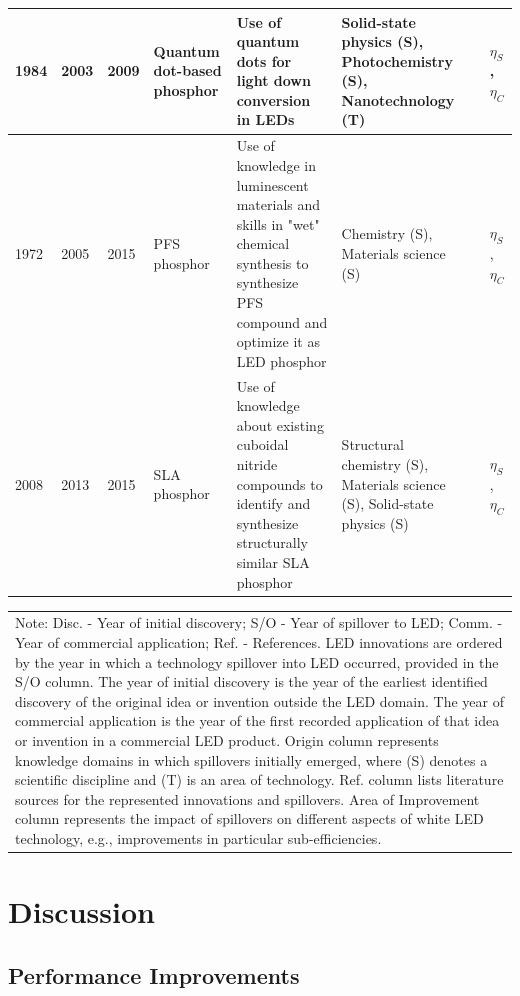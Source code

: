 \documentclass[journal=jacsat,manuscript=article]{achemso}
\begin{document}
\begin{table}[h!]
\begin{tabularx}{\textwidth}{|l|l|l|X|X|X|l|X|}
        1984 & 2003 & 2009 & Quantum dot-based phosphor & Use of quantum dots for light down conversion in LEDs & Solid-state physics (S), Photochemistry (S), Nanotechnology (T) &\cite{fojtik1984photo,simmonsfinal,ledprof_nexxusqd,bourzac2013quantum} & $\eta_S$, $\eta_C$ \\ \hline
        1972 & 2005 & 2015 & PFS phosphor & Use of knowledge in luminescent materials and skills in "wet" chemical synthesis to synthesize PFS compound and optimize it as LED phosphor & Chemistry (S), Materials science (S) &\cite{paulusz1973efficient,radkov2009red,Murphy2015} & $\eta_S$, $\eta_C$ \\ \hline
        2008 & 2013 & 2015 & SLA phosphor & Use of knowledge about existing cuboidal nitride compounds to identify and synthesize structurally similar SLA phosphor & Structural chemistry (S), Materials science (S), Solid-state physics (S) &\cite{Park2008New,schmidt2013new,Pust2014} & $\eta_S$, $\eta_C$ \\ \hline
    \end{tabularx}
    \begin{tabular}{@{}p{\linewidth}@{}}
        Note: Disc. - Year of initial discovery; S/O - Year of spillover to LED; Comm. - Year of commercial application; Ref. - References. LED innovations are ordered by the year in which a technology spillover into LED occurred, provided in the S/O column. The year of initial discovery is the year of the earliest identified discovery of the original idea or invention outside the LED domain. The year of commercial application is the year of the first recorded application of that idea or invention in a commercial LED product. Origin column represents knowledge domains in which spillovers initially emerged, where (S) denotes a scientific discipline and (T) is an area of technology. Ref. column lists literature sources for the represented innovations and spillovers. Area of Improvement column represents the impact of spillovers on different aspects of white LED technology, e.g., improvements in particular sub-efficiencies.
    \end{tabular}
    \label{tab:spillovers}
\end{table}

\section{Discussion}

\subsection{Performance Improvements}
\end{document}
